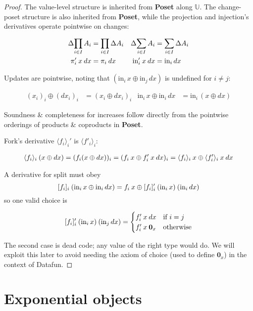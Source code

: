 \documentclass{rntz}\usepackage[a5]{rntzgeometry}\usepackage[fullwidth=13cm,width=320pt,width=115mm]{narrow}
\newcommand\mathvar[1]{\ensuremath{#1}} %
\newcommand\cat\textbf
\newcommand\Poset{\cat{Poset}}
\newcommand\D\Delta
\newcommand\injc{\text{in}}
\newcommand\inj[1]{\injc_{#1}\,}
\newcommand\zero{\ensuremath{\mathbold{0}}}
\newcommand\<{\mskip 4mu plus 4mu minus 1mu}
\newcommand\dx{\mathvar{dx}}
\newcommand\valfn{\ensuremath{\mathbb{U}}}
\newcommand\chgs[1]{\D{#1}}
\newcommand\deriv[1]{\ensuremath{#1'}}
\newcommand\upd{\mathbin{\oplus}}
\newcommand\fork[1]{\langle{#1}\rangle}
\newcommand\krof[1]{[{#1}]}
\begin{document}
\begin{proof}
  The value-level structure is inherited from \Poset{} along \valfn{}. The
  change-poset structure is also inherited from \Poset{}, while the projection
  and injection's derivatives operate pointwise on changes:

  \begin{align*}
    \chgs{\prod_{i \in I} A_i} &= \prod_{i \in I} \chgs A_i &
    \chgs{\sum_{i \in I} A_i} &= \sum_{i \in I} \chgs A_i
    \\
    \deriv\pi_i\<x\<\dx &= \pi_i\<\dx & \deriv\injc_i\<x\<\dx &= \inj i \dx
  \end{align*}

  \noindent Updates are pointwise, noting that $(\inj i x \upd \inj j \dx)$ is
  undefined for $i \ne j$:

  \begin{align*}
    (x_i)_i \upd (\dx_i)_i &= (x_i \upd \dx_i)_i &
    \inj i x \upd \inj i \dx &= \inj i (x \upd \dx)
  \end{align*}

  \noindent
  Soundness \& completeness for increases follow directly from the pointwise
  orderings of products \& coproducts in \Poset{}.

  Fork's derivative $\deriv{\fork{f_i}_i}$ is $\fork{\deriv f_i}_i$:

  \begin{gather*}
    \fork{f_i}_i \<(x \upd \dx)
    = (f_i(x \upd \dx))_i
    = (f_i\<x \upd \deriv f_i \<x \<\dx)_i
    = \fork{f_i}_i \<x \upd \fork{\deriv f_i}_i \<x \<\dx
  \end{gather*}

  \noindent
  A derivative for split must obey \[ \krof{f_i}_i\<(\inj i x \upd \inj i \dx)
  = f_i\<x \upd \deriv{\krof{f_i}_i} \<(\inj i x) \<(\inj i \dx) \] so one
  valid choice is

  \[\deriv{\krof{f_i}_i} \<(\inj i x) \<(\inj j \dx)
  =
  \begin{cases}
    \deriv f_i \<x \<\dx & \text{if}~i = j\\
    \deriv f_i \<x \<\zero_x & \text{otherwise}
  \end{cases}
  \]

  \noindent
  The second case is dead code; any value of the right type would do. We will
  exploit this later to avoid needing the axiom of choice (used to define
  $\zero_x$) in the context of Datafun.
\end{proof}


\section{Exponential objects}
\end{document}

